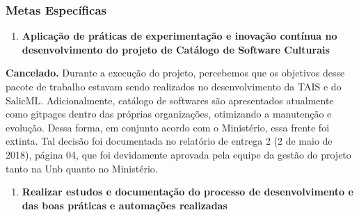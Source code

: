 \hypertarget{metas-especuxedficas-1}{%
\subsubsection{Metas Específicas}\label{metas-especuxedficas-1}}

\begin{enumerate}
\def\labelenumi{\arabic{enumi}.}
\tightlist
\item
  \textbf{Aplicação de práticas de experimentação e inovação contínua no
  desenvolvimento do projeto de Catálogo de Software Culturais}
\end{enumerate}

\textbf{Cancelado.} Durante a execução do projeto, percebemos que os
objetivos desse pacote de trabalho estavam sendo realizados no
desenvolvimento da TAIS e do SalicML. Adicionalmente, catálogo de
softwares são apresentados atualmente como gitpages dentro das próprias
organizações, otimizando a manutenção e evolução. Dessa forma, em
conjunto acordo com o Ministério, essa frente foi extinta. Tal decisão
foi documentada no relatório de entrega 2 (2 de maio de 2018), página
04, que foi devidamente aprovada pela equipe da gestão do projeto tanto
na Unb quanto no Ministério.

\begin{enumerate}
\def\labelenumi{\arabic{enumi}.}
\setcounter{enumi}{1}
\tightlist
\item
  \textbf{Realizar estudos e documentação do processo de desenvolvimento
  e das boas práticas e automações realizadas}
\end{enumerate}

